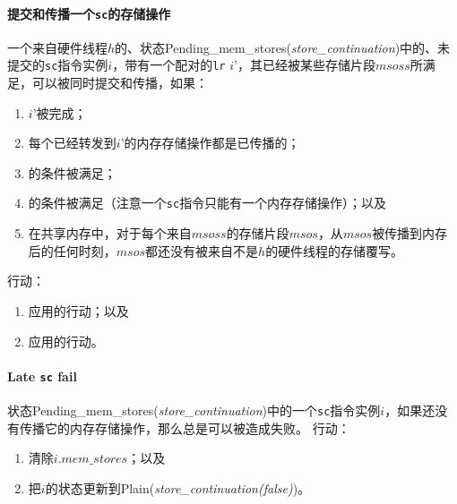 \paragraph{提交和传播一个{\tt sc}的存储操作}\label{omm:commit_sc}
一个来自硬件线程$h$的、状态{\sc Pending\_mem\_stores}({\it store\_continuation})中的、未提交的{\tt sc}指令实例$i$，带有一个配对的{\tt lr} $i’$，其已经被某些存储片段$msoss$所满足，可以被同时提交和传播，如果：
\begin{enumerate}
\item $i’$被完成； %
\item 每个已经转发到$i’$的内存存储操作都是已传播的； %
\item {}的条件被满足； %
\item {}的条件被满足（注意一个{\tt sc}指令只能有一个内存存储操作）；以及  %
\item 在共享内存中，对于每个来自$msoss$的存储片段$msos$，从$msos$被传播到内存后的任何时刻，$msos$都还没有被来自不是$h$的硬件线程的存储覆写。  %
\end{enumerate}
行动：
\begin{enumerate}
\item 应用的行动；以及  %
\item 应用的行动。  %
\end{enumerate}


\paragraph{Late {\tt sc} fail}\label{omm:late_sc_fail}
状态{\sc Pending\_mem\_stores}({\it store\_continuation})中的一个{\tt sc}指令实例$i$，如果还没有传播它的内存存储操作，那么总是可以被造成失败。
行动：
\begin{enumerate}
\item 清除$i.\textit{mem\_stores}$；以及 %
\item 把$i$的状态更新到{\sc Plain}({\it store\_continuation(false)})。  %
\end{enumerate}

